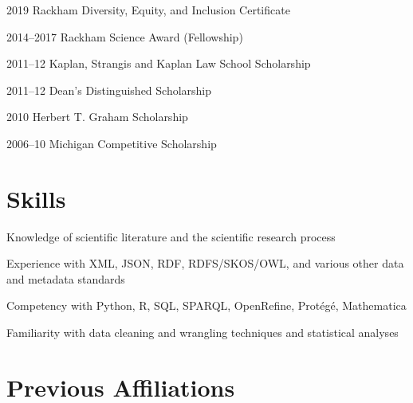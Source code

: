 \documentclass[12pt,letterpaper]{report}
\newcommand{\listitemspace}{0.15em}
\renewenvironment{itemize}
{\begin{list}{}{\setlength{\leftmargin}{0em}
            \setlength{\parskip}{0em}
            \setlength{\itemsep}{\listitemspace}
            \setlength{\parsep}{\listitemspace}}}
    {\end{list}}
\begin{document}
    \begin{tablist}
    
        \item[2019] \tab Rackham Diversity, Equity, and Inclusion Certificate

        \item[2014--2017] \tab Rackham Science Award (Fellowship)
        
        \item[2011--12] \tab Kaplan, Strangis and Kaplan Law School Scholarship 
        
        \item[2011--12] \tab Dean's Distinguished Scholarship
        
        \item[2010] \tab Herbert T. Graham Scholarship
        
        \item[2006--10] \tab Michigan Competitive Scholarship

    \end{tablist}



    \section*{Skills}

    \begin{itemize}

        \item Knowledge of scientific literature and the scientific research process
        
        \item Experience with XML, JSON, RDF, RDFS/SKOS/OWL, and various other data and metadata standards
        
        \item Competency with Python, R, SQL, SPARQL, OpenRefine, Protégé, Mathematica
        
        \item Familiarity with data cleaning and wrangling techniques and statistical analyses
        
    \end{itemize}
    
    
    
    \section*{Previous Affiliations}
    
\end{document}
